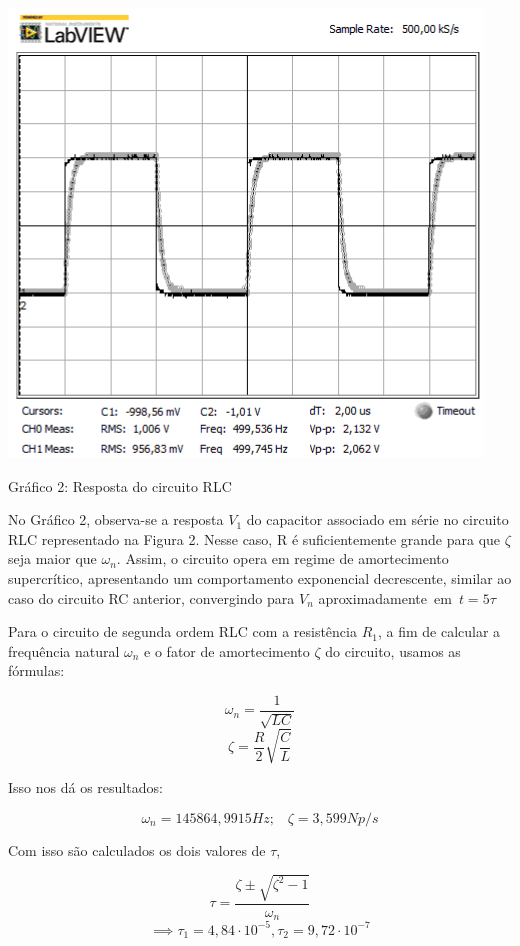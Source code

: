 \documentclass[a4 paper]{article}
\begin{document}
\newpage
\begin{table}[h]
\centering
\includegraphics[scale=0.6]{rgadicoas/rgadicoa2}
\end{table}

\begin{center}
Gráfico 2: Resposta do circuito RLC
\end{center}

No Gráfico 2, observa-se a resposta $V_1$ do capacitor associado em série no circuito RLC representado na Figura 2. Nesse caso, R é suficientemente grande para que $\zeta$ seja maior que $\omega_n$. Assim, o circuito opera em regime de amortecimento supercrítico, apresentando um comportamento exponencial decrescente, similar ao caso do circuito RC anterior, convergindo para $V_n$ aproximadamente em $t=5\tau$

Para o circuito de segunda ordem RLC com a resistência $R_1$, a fim de calcular a frequência natural $\omega_n$ e o fator de amortecimento $\zeta$ do circuito, usamos as fórmulas:

\[\omega_n = \frac{1}{\sqrt{LC}}\]
\[\zeta = \frac{R}{2}\sqrt{\frac{C}{L}}\]

Isso nos dá os resultados:

\[\omega_n=145864,9915Hz;\hspace{10pt}\zeta=3,599Np/s\]

Com isso são calculados os dois valores de $\tau$, 

\[\tau = \frac{\zeta\pm\sqrt{\zeta^2-1}}{\omega_n}\]
\[\implies \tau_1=4,84\cdot10^{-5}, \tau_2=9,72\cdot10^{-7}\]
\end{document}
